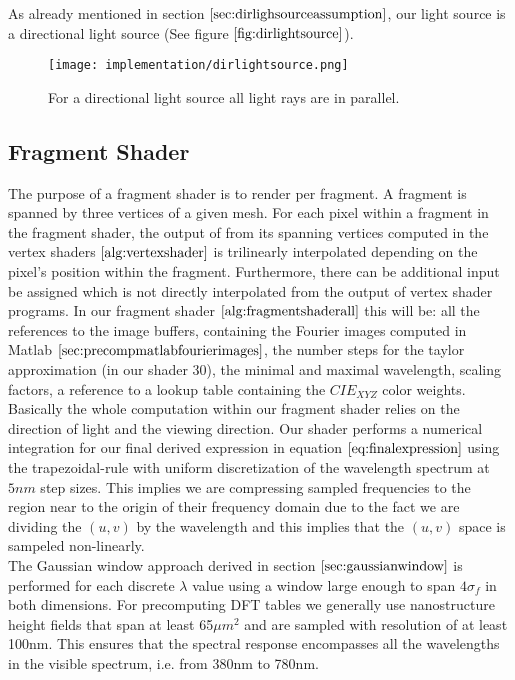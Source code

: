 As already mentioned in section $\ref{sec:dirlighsourceassumption}$, our light source is a directional light source (See figure $\ref{fig:dirlightsource}$).

\begin{figure}[H]
  \centering
  \texttt{[image: implementation/dirlightsource.png]}
  \caption{For a directional light source all light rays are in parallel.}
  \label{fig:dirlightsource}
\end{figure}

\subsection{Fragment Shader}
\label{sec:fragmentshader}
The purpose of a fragment shader is to render per fragment. A fragment is spanned by three vertices of a given mesh. For each pixel within a fragment in the fragment shader, the output of from its spanning vertices computed in the vertex shaders $\ref{alg:vertexshader}$ is trilinearly interpolated depending on the pixel's position within the fragment. Furthermore, there can be additional input be assigned which is not directly interpolated from the output of vertex shader programs. In our fragment shader $\ref{alg:fragmentshaderall}$ this will be: all the references to the image buffers, containing the Fourier images computed in Matlab $\ref{sec:precompmatlabfourierimages}$, the number steps for the taylor approximation (in our shader 30), the minimal and maximal wavelength, scaling factors, a reference to a lookup table containing the $CIE_{XYZ}$ color weights. Basically the whole computation within our fragment shader relies on the direction of light and the viewing direction. Our shader performs a numerical integration for our final derived expression in equation $\ref{eq:finalexpression}$ using the trapezoidal-rule with uniform discretization of the wavelength spectrum at $5nm$ step sizes. This implies we are compressing sampled frequencies to the region near to the origin of their frequency domain due to the fact we are dividing the $(u,v)$ by the wavelength and this implies that the $(u,v)$ space is sampeled non-linearly. \\

The Gaussian window approach derived in section $\ref{sec:gaussianwindow}$ is performed for each discrete $\lambda$ value using a window large enough to span $4\sigma_f$ in both dimensions. For precomputing DFT tables we generally use nanostructure height fields that span at least 65$\mu m^2$ and are sampled with resolution of at least 100nm. This ensures that the spectral response encompasses all the wavelengths in the visible spectrum, i.e. from 380nm to 780nm.


